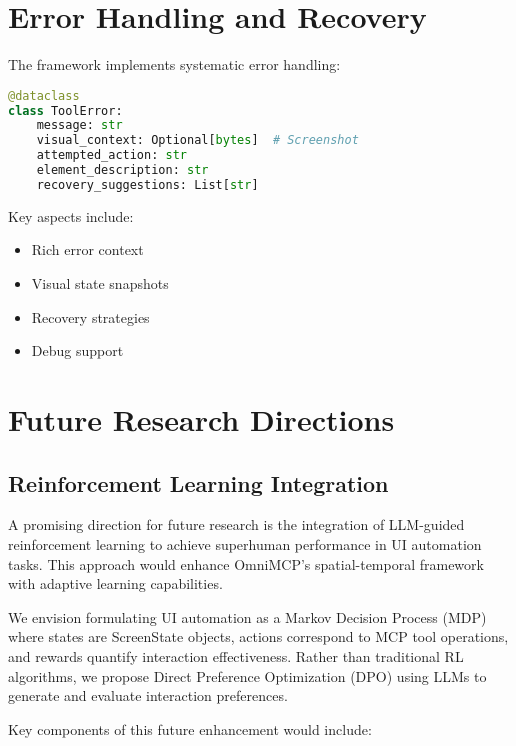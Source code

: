 \documentclass{article}
\begin{document}
\section{Error Handling and Recovery}

The framework implements systematic error handling:

\begin{lstlisting}[language=Python]
@dataclass
class ToolError:
    message: str
    visual_context: Optional[bytes]  # Screenshot
    attempted_action: str
    element_description: str
    recovery_suggestions: List[str]
\end{lstlisting}

Key aspects include:
\begin{itemize}
    \item Rich error context
    \item Visual state snapshots
    \item Recovery strategies
    \item Debug support
\end{itemize}

\section{Future Research Directions}

\subsection{Reinforcement Learning Integration}

A promising direction for future research is the integration of LLM-guided reinforcement learning to achieve superhuman performance in UI automation tasks. This approach would enhance OmniMCP's spatial-temporal framework with adaptive learning capabilities.

We envision formulating UI automation as a Markov Decision Process (MDP) where states are ScreenState objects, actions correspond to MCP tool operations, and rewards quantify interaction effectiveness. Rather than traditional RL algorithms, we propose Direct Preference Optimization (DPO) using LLMs to generate and evaluate interaction preferences.

Key components of this future enhancement would include:
\end{document}
